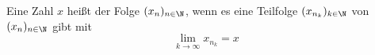 Eine Zahl $x$ heißt  der Folge $(x_n)_{n \in \N}$, wenn es eine Teilfolge $(x_{n_k})_{k \in \N}$ von $(x_n)_{n \in \N}$ gibt mit
$$\lim_{k \to \infty} x_{n_k} = x$$